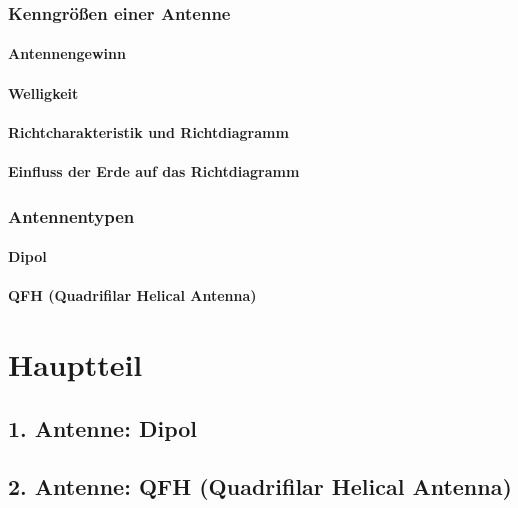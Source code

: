 \documentclass[12pt]{scrreprt}
\begin{document}
	\subsection{Kenngrößen einer Antenne}
	
	\subsubsection{Antennengewinn}
	
	\subsubsection{Welligkeit}
	
	\subsubsection{Richtcharakteristik und Richtdiagramm}
	
	\subsubsection{Einfluss der Erde auf das Richtdiagramm}
	
	\subsection{Antennentypen}
	
	\subsubsection{Dipol}
		
	\subsubsection{QFH (Quadrifilar Helical Antenna)}
	

	
	\pagebreak
	
	\chapter{Hauptteil}
	\section{1. Antenne: Dipol}
	
	\section{2. Antenne: QFH (Quadrifilar Helical Antenna)}
	
\end{document}
